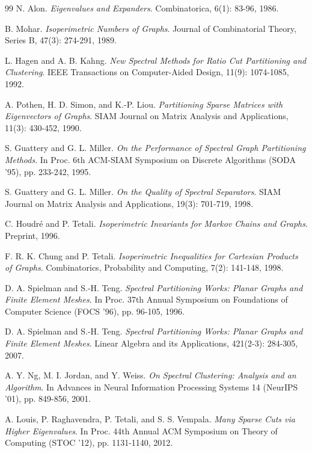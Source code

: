 \documentclass{article}
\theoremstyle{definition}
\theoremstyle{remark}
\begin{document}
\begin{thebibliography}{99}
N. Alon.
\textit{Eigenvalues and Expanders}.
Combinatorica, 6(1): 83-96, 1986.

B. Mohar.
\textit{Isoperimetric Numbers of Graphs}.
Journal of Combinatorial Theory, Series B, 47(3): 274-291, 1989.

L. Hagen and A. B. Kahng.
\textit{New Spectral Methods for Ratio Cut Partitioning and Clustering}.
IEEE Transactions on Computer-Aided Design, 11(9): 1074-1085, 1992.

A. Pothen, H. D. Simon, and K.-P. Liou.
\textit{Partitioning Sparse Matrices with Eigenvectors of Graphs}.
SIAM Journal on Matrix Analysis and Applications, 11(3): 430-452, 1990.

S. Guattery and G. L. Miller.
\textit{On the Performance of Spectral Graph Partitioning Methods}.
In Proc. 6th ACM-SIAM Symposium on Discrete Algorithms (SODA '95), pp. 233-242, 1995.

S. Guattery and G. L. Miller.
\textit{On the Quality of Spectral Separators}.
SIAM Journal on Matrix Analysis and Applications, 19(3): 701-719, 1998.

C. Houdr\'e and P. Tetali.
\textit{Isoperimetric Invariants for Markov Chains and Graphs}.
Preprint, 1996.

F. R. K. Chung and P. Tetali.
\textit{Isoperimetric Inequalities for Cartesian Products of Graphs}.
Combinatorics, Probability and Computing, 7(2): 141-148, 1998.

D. A. Spielman and S.-H. Teng.
\textit{Spectral Partitioning Works: Planar Graphs and Finite Element Meshes}.
In Proc. 37th Annual Symposium on Foundations of Computer Science (FOCS '96), pp. 96-105, 1996.

D. A. Spielman and S.-H. Teng.
\textit{Spectral Partitioning Works: Planar Graphs and Finite Element Meshes}.
Linear Algebra and its Applications, 421(2-3): 284-305, 2007.

A. Y. Ng, M. I. Jordan, and Y. Weiss.
\textit{On Spectral Clustering: Analysis and an Algorithm}.
In Advances in Neural Information Processing Systems 14 (NeurIPS '01), pp. 849-856, 2001.

A. Louis, P. Raghavendra, P. Tetali, and S. S. Vempala.
\textit{Many Sparse Cuts via Higher Eigenvalues}.
In Proc. 44th Annual ACM Symposium on Theory of Computing (STOC '12), pp. 1131-1140, 2012.


\end{thebibliography}
\end{document}
